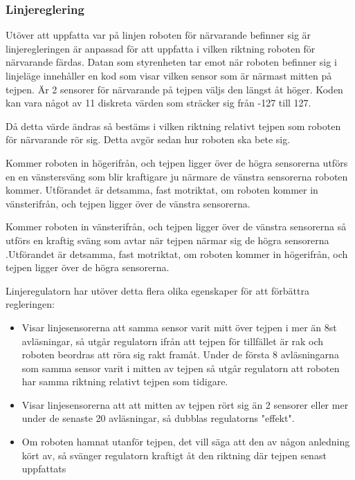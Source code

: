 \subsubsection{Linjereglering}
\label{sec:linjereglering}
Utöver att uppfatta var på linjen roboten för närvarande befinner sig är 
linjeregleringen är anpassad för att uppfatta i vilken riktning roboten för 
närvarande färdas. Datan som styrenheten tar emot när roboten befinner sig i 
linjeläge innehåller en kod som visar vilken sensor som är närmast mitten på 
tejpen. Är 2 sensorer för närvarande på tejpen väljs den längst åt höger. 
Koden kan vara något av 11 diskreta värden som sträcker sig från -127 till 127.

Då detta värde ändras så bestäms i vilken riktning relativt tejpen som 
roboten för närvarande rör sig. Detta avgör sedan hur roboten ska bete sig.

Kommer roboten in högerifrån, och tejpen ligger över de högra sensorerna 
utförs en en vänstersväng som blir kraftigare ju närmare de vänstra 
sensorerna roboten kommer. Utförandet är detsamma, fast motriktat, om roboten 
kommer in vänsterifrån, och tejpen ligger över de vänstra sensorerna.

Kommer roboten in vänsterifrån, och tejpen ligger över de vänstra sensorerna 
så utförs en kraftig sväng som avtar när tejpen närmar sig de högra sensorerna
.Utförandet är detsamma, fast motriktat, om roboten kommer in högerifrån, och 
tejpen ligger över de högra sensorerna.


Linjeregulatorn har utöver detta flera olika egenskaper för att förbättra 
regleringen:
\begin{itemize}
\item Visar linjesensorerna att samma sensor varit mitt över tejpen i mer än 8st 
avläsningar, så utgår regulatorn ifrån att tejpen för tillfället är rak och roboten 
beordras att röra sig rakt framåt. Under de första 8 avläsningarna som samma 
sensor varit i mitten av tejpen så utgår regulatorn att roboten har samma riktning 
relativt tejpen som tidigare.
\item Visar linjesensorerna att att mitten av tejpen rört sig än 2 sensorer eller mer
 under de senaste 20 avläsningar, så dubblas regulatorns "effekt".
\item Om roboten hamnat utanför tejpen, det vill säga att den av någon anledning 
kört av, så svänger regulatorn kraftigt åt den riktning där tejpen senast uppfattats
\end{itemize}



